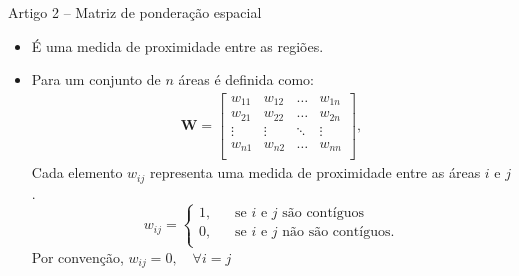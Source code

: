 \documentclass[aspectratio=169]{beamer}
\begin{document}
\begin{frame}{Artigo 2 -- Matriz de ponderação espacial}
	\begin{itemize}
	    \item É uma medida de proximidade entre as regiões.
	    \item Para um conjunto de $n$ áreas é definida como: 
	    \begin{align*}
        	\boldsymbol{W} =
	        \left[
	        \begin{array}{cccc}
		        w_{11} & w_{12} & \dots & w_{1n} \\
		        w_{21} & w_{22} & \dots &w_{2n} \\
		        \vdots & \vdots & \ddots & \vdots \\
		        w_{n1} & w_{n2} & \dots & w_{nn}\\
	        \end{array}
	        \right],
        \end{align*}
        \noindent Cada elemento $w_{ij}$ representa uma medida de proximidade entre as áreas $i$ e $j$. 
        \[
            w_{ij} = 
            \begin{cases}
                \text{1,} & \quad\text{se $i$ e $j$ são contíguos} \\
                \text{0,} & \quad\text{se $i$ e $j$ não são contíguos.}\\
            \end{cases}
        \]
        \noindent Por convenção, $w_{ij}=0,\quad \forall i=j$
	\end{itemize}
\end{frame}

\end{document}
